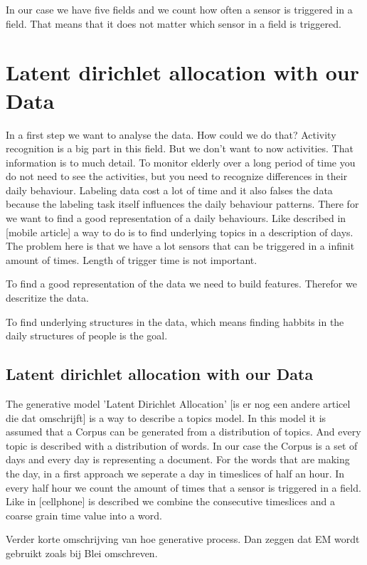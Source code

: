 \documentclass[11pt,a4paper]{report}
\begin{document}
In our case we have five fields and we count how often a sensor is triggered in a field. That means that it does not matter which sensor in a field is triggered.




\section{Latent dirichlet allocation with our Data}
In a first step we want to analyse the data. How could we do that? Activity recognition is a big part in this field. But we don't want to now activities. That information is to much detail. To monitor elderly over a long period of time you do not need to see the activities, but you need to recognize differences in their daily behaviour.
Labeling data cost a lot of time and it also falses the data because the labeling task itself influences the daily behaviour patterns. There for we want to find a good representation of a daily behaviours.
Like described in [mobile article] a way to do is to find underlying topics in a description of days.
The problem here is that we have a lot sensors that can be triggered in a infinit amount of times. Length of trigger time is not important.


To find a good representation of the data we need to build features. Therefor we descritize the data. 

To find underlying structures in the data, which means finding habbits in the daily structures of people is the goal.


\subsection{Latent dirichlet allocation with our Data}
The generative model 'Latent Dirichlet Allocation' [is er nog een andere articel die dat omschrijft] is a way to describe a topics model. In this model it is assumed that a Corpus can be generated from a distribution of topics. And every topic is described with a distribution of words.
In our case the Corpus is a set of days and every day is representing a document. For the words that are making the day, in a first approach we seperate a day in timeslices of half an hour. In every half hour we count the amount of times that a sensor is triggered in a field. Like in [cellphone] is described we combine the consecutive timeslices and a coarse grain time value into a word.

Verder korte omschrijving van hoe generative process. Dan zeggen dat EM wordt gebruikt zoals bij Blei omschreven.
\end{document}
